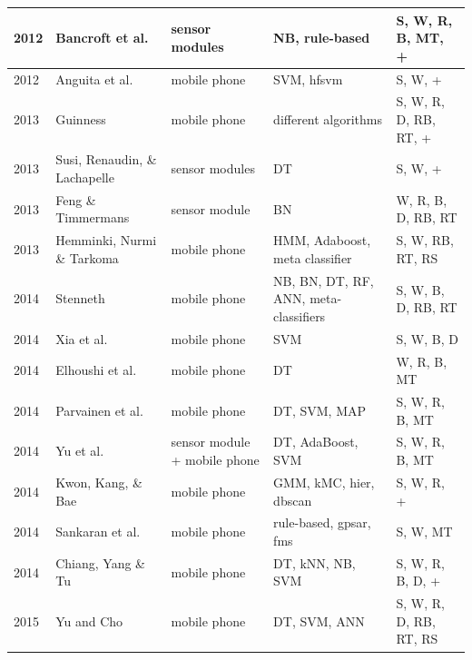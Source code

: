 \begin{center}
\begin{longtable} {|l|>{\raggedright}p{3cm}|p{2.4cm}|>{\centering\arraybackslash}p{2.5cm}|>{\centering\arraybackslash}p{2.2cm}|}
2012 & Bancroft et al. \cite{Bancroft2012}& sensor modules & NB, rule-based & S, W, R, B, MT, +\\ \hline
2012 & Anguita et al. \cite{anguita2012human} & mobile phone & SVM, \acrshort{hfsvm} & S, W, + \\ \hline
2013 & Guinness \cite{Guinness2013}& mobile phone & 20 different algorithms & S, W, R, D, RB, RT, +\\ \hline
2013 & Susi, Renaudin, \& Lachapelle \cite{susi2013motion}& sensor modules & DT & S, W, + \\ \hline
2013 & Feng \& Timmermans \cite{feng2013transportation}& sensor module  & BN & W, R, B, D, RB, RT \\ \hline
2013 & Hemminki, Nurmi \& Tarkoma \cite{hemminki2013accelerometer}& mobile phone & HMM, Adaboost, meta classifier & S, W, RB, RT, RS \\ \hline
2014 & Stenneth \cite{stenneth2014detecting} & mobile phone & NB, BN, DT, RF, ANN, meta-classifiers & S, W, B, D, RB, RT\\ \hline
2014 & Xia et al. \cite{xia2014using}& mobile phone & SVM & S, W, B, D\\ \hline
2014 & Elhoushi et al. \cite{elhoushi2014robust}& mobile phone & DT & W, R, B, MT \\ \hline
2014 & Parvainen et al. \cite{parviainen2014adaptive} & mobile phone & DT, SVM, MAP & S, W, R, B, MT \\ \hline
2014 & Yu et al. \cite{yu2014big} & sensor module + mobile phone & DT, AdaBoost, SVM & S, W, R, B, MT \\ \hline
2014 & Kwon, Kang, \& Bae \cite{kwon2014unsupervised} & mobile phone & GMM, kMC, \acrshort{hier}, \acrshort{dbscan} & S, W, R, +\\ \hline
2014 & Sankaran et al. \cite{sankaran2014using} & mobile phone & rule-based, \acrshort{gpsar}, \acrshort{fms} & S, W, MT \\ \hline
2014 & Chiang, Yang \& Tu \cite{chiang2014pattern} & mobile phone & DT, kNN, NB, SVM & S, W, R, B, D, + \\ \hline 
2015 & Yu and Cho \cite{yu2015low} & mobile phone & DT, SVM, ANN & S, W, R, D, RB, RT, RS \\ \hline
\end{longtable}
\end{center}
%
%
